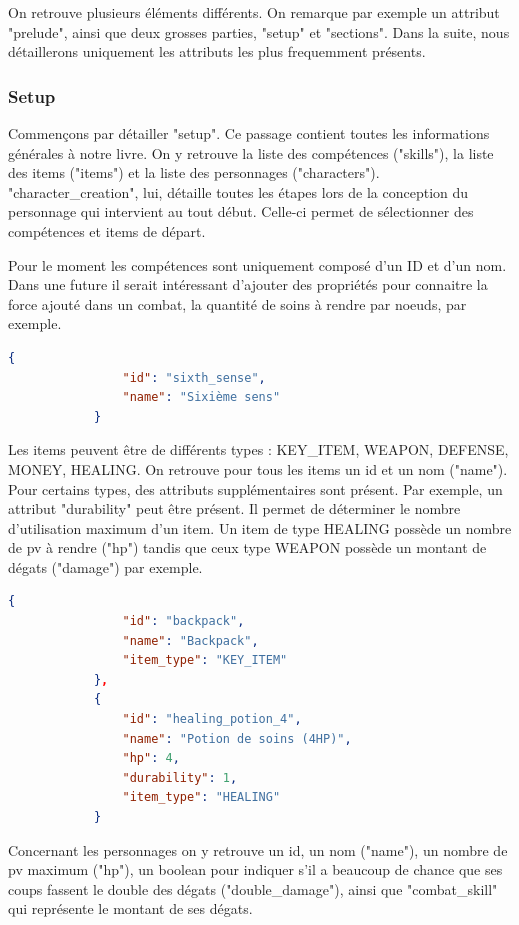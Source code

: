 			On retrouve plusieurs éléments différents. On remarque par exemple un attribut "prelude", ainsi que deux grosses parties, "setup" et "sections". Dans la suite, nous détaillerons uniquement les attributs les plus frequemment présents.

		\subsubsection{Setup}

			Commençons par détailler "setup". Ce passage contient toutes les informations générales à notre livre. On y retrouve la liste des compétences ("skills"), la liste des items ("items") et la liste des personnages ("characters"). "character\_creation", lui, détaille toutes les étapes lors de la conception du personnage qui intervient au tout début. Celle-ci permet de sélectionner des compétences et items de départ.

			Pour le moment les compétences sont uniquement composé d'un ID et d'un nom. Dans une future \maj{} il serait intéressant d'ajouter des propriétés pour connaitre la force ajouté dans un combat, la quantité de soins à rendre par noeuds, par exemple.

			\begin{lstlisting}[gobble=12, language=json, caption=Exemple de compétence]
			{
				"id": "sixth_sense",
				"name": "Sixième sens"
			}
			\end{lstlisting}

			Les items peuvent être de différents types : KEY\_ITEM, WEAPON, DEFENSE, MONEY, HEALING. On retrouve pour tous les items un id et un nom ("name"). Pour certains types, des attributs supplémentaires sont présent. Par exemple, un attribut "durability" peut être présent. Il permet de déterminer le nombre d'utilisation maximum d'un item. Un item de type HEALING possède un nombre de pv à rendre ("hp") tandis que ceux type WEAPON possède un montant de dégats ("damage") par exemple.

			\begin{lstlisting}[gobble=12, language=json, caption=Exemple d'items]
			{
				"id": "backpack",
				"name": "Backpack",
				"item_type": "KEY_ITEM"
			},
			{
				"id": "healing_potion_4",
				"name": "Potion de soins (4HP)",
				"hp": 4,
				"durability": 1,
				"item_type": "HEALING"
			}
			\end{lstlisting}

			Concernant les personnages on y retrouve un id, un nom ("name"), un nombre de pv maximum ("hp"), un boolean pour indiquer s'il a beaucoup de chance que ses coups fassent le double des dégats ("double\_damage"), ainsi que "combat\_skill" qui représente le montant de ses dégats.

